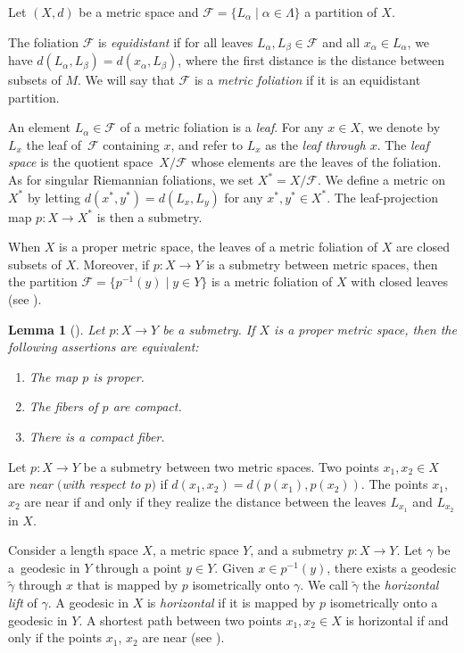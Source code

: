 \documentclass[10pt,a4paper]{amsart}
\numberwithin{equation}{section}
\newtheorem{lem}[thm]{Lemma}
\theoremstyle{definition}
\newcommand{\fol}{\mathcal{F}}
\begin{document}
Let $(X,d)$ be a metric space and $\fol = \{L_\alpha\mid \alpha\in \Lambda\}$ a partition of $X$.

The foliation $\fol$ is \emph{equidistant} if for all leaves $L_\alpha,L_\beta\in \fol$ and all $x_\alpha \in L_\alpha$, we have $d(L_\alpha,L_\beta) = d(x_\alpha,L_\beta)$, where the first distance is the distance between subsets of $M$.
We will say that $\fol$ is a \emph{metric foliation} if it is an equidistant partition.
	
An element $L_\alpha\in \fol$ of a metric foliation is a \emph{leaf}. For any $x\in X$, we denote by $L_x$ the leaf of~$\fol$ containing $x$, and refer to $L_x$ as the \emph{leaf through $x$}. The \emph{leaf space} is the quotient space~${X/\fol}$ whose elements are the leaves of the foliation. As for singular Riemannian foliations, we set $X^* = X/\fol$. We define a metric on $X^*$ by letting $d(x^*,y^*) = d(L_x,L_y)$ for any $x^*,y^*\in X^*$. The leaf-projection map $p\colon X\to X^*$ is then a submetry.
	
When $X$ is a proper metric space, the leaves of a metric foliation of $X$ are closed subsets of $X$. Moreover, if $p\colon X\to Y$ is a submetry between metric spaces, then the partition $\fol = \big\{p^{-1}(y)\mid y\in Y\big\}$ is a metric foliation of $X$ with closed leaves (see \cite[p.~19]{Lytchak}).

\begin{lem}[]
\label{L: characterization proper submetries}
Let $p\colon X\to Y$ be a submetry. If $X$ is a proper metric space, then the following assertions are equivalent:
\begin{enumerate}\itemsep=0pt
		\item[$(1)$] The map $p$ is proper.
		\item[$(2)$] The fibers of $p$ are compact.
		\item[$(3)$] There is a compact fiber.
\end{enumerate}
\end{lem}

	
Let $p\colon X	\to Y$ be a submetry between two metric spaces. Two points $x_1,x_2\in X$ are \emph{near $($with respect to $p)$} if $d(x_1,x_2) = d(p(x_1),p(x_2))$. The points $x_1$, $x_2$ are near if and only if they realize the distance between the leaves $L_{x_1}$ and $L_{x_2}$ in $X$.
	
Consider a length space $X$, a metric space $Y$, and a submetry $p\colon X\to Y$. Let $\gamma$ be a~geodesic in $Y$ through a point $y\in Y$. Given $x\in p^{-1}(y)$, there exists a geodesic $\tilde{\gamma}$ through $x$ that is mapped by $p$ isometrically onto $\gamma$. We call $\tilde{\gamma}$ the \emph{horizontal lift} of $\gamma$.	A geodesic in $X$ is \emph{horizontal } if it is mapped by $p$ isometrically onto a geodesic in $Y$. A shortest path between two points $x_1,x_2\in X$ is horizontal if and only if the points $x_1$, $x_2$ are near (see \cite[p.~21]{Lytchak}).
	
\end{document}
